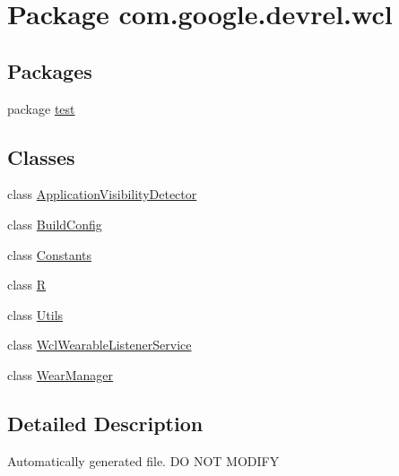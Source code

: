 \hypertarget{namespacecom_1_1google_1_1devrel_1_1wcl}{}\section{Package com.\+google.\+devrel.\+wcl}
\label{namespacecom_1_1google_1_1devrel_1_1wcl}
\subsection*{Packages}
\begin{DoxyCompactItemize}
\item 
package \hyperlink{namespacecom_1_1google_1_1devrel_1_1wcl_1_1test}{test}
\end{DoxyCompactItemize}
\subsection*{Classes}
\begin{DoxyCompactItemize}
\item 
class \hyperlink{classcom_1_1google_1_1devrel_1_1wcl_1_1ApplicationVisibilityDetector}{Application\+Visibility\+Detector}
\item 
class \hyperlink{classcom_1_1google_1_1devrel_1_1wcl_1_1BuildConfig}{Build\+Config}
\item 
class \hyperlink{classcom_1_1google_1_1devrel_1_1wcl_1_1Constants}{Constants}
\item 
class \hyperlink{classcom_1_1google_1_1devrel_1_1wcl_1_1R}{R}
\item 
class \hyperlink{classcom_1_1google_1_1devrel_1_1wcl_1_1Utils}{Utils}
\item 
class \hyperlink{classcom_1_1google_1_1devrel_1_1wcl_1_1WclWearableListenerService}{Wcl\+Wearable\+Listener\+Service}
\item 
class \hyperlink{classcom_1_1google_1_1devrel_1_1wcl_1_1WearManager}{Wear\+Manager}
\end{DoxyCompactItemize}


\subsection{Detailed Description}
Automatically generated file. DO N\+OT M\+O\+D\+I\+FY 